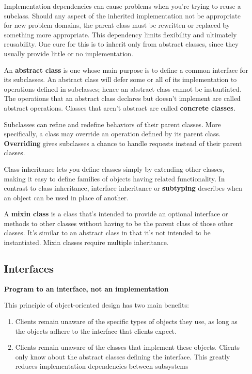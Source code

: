 \documentclass{article}
\begin{document}
Implementation dependencies can cause problems when you're trying to reuse a subclass. Should any aspect of the inherited implementation not be appropriate for new problem domains, the parent class must be rewritten or replaced by something more appropriate. This dependency limits flexibility and ultimately reusability. One cure for this is to inherit only from abstract classes, since they usually provide little or no implementation.

An \textbf{abstract class} is one whose main purpose is to define a common interface for its subclasses. An abstract class will defer some or all of its implementation to operations defined in subclasses; hence an abstract class cannot be instantiated. The operations that an abstract class declares but doesn't implement are called abstract operations. Classes that aren't abstract are called \textbf{concrete classes}.

Subclasses can refine and redefine behaviors of their parent classes. More specifically, a class may override an operation defined by its parent class. \textbf{Overriding} gives subclasses a chance to handle requests instead of their parent classes. 

Class inheritance lets you define classes simply by extending other classes, making it easy to define families of objects having related functionality. In contrast to class inheritance, interface inheritance or \textbf{subtyping} describes when an object can be used in place of another.

A \textbf{mixin class} is a class that's intended to provide an optional interface or methods to other classes without having to be the parent class of those other classes. It's similar to an abstract class in that it's not intended to be instantiated. Mixin classes require multiple inheritance.

\subsection{Interfaces}

\textbf{Program to an interface, not an implementation}

This principle of object-oriented design has two main benefits:
\begin{enumerate}
    \item Clients remain unaware of the specific types of objects they use, as long as the objects adhere to the interface that clients expect.
    \item Clients remain unaware of the classes that implement these objects. Clients only know about the abstract classes defining the interface.    This greatly reduces implementation dependencies between subsystems
\end{enumerate}
\end{document}
